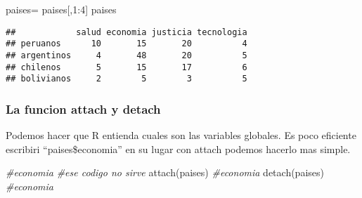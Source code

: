 \documentclass[
]{article}
\newenvironment{Shaded}{\begin{snugshade}}{\end{snugshade}}
\newcommand{\CommentTok}[1]{\textcolor[rgb]{0.56,0.35,0.01}{\textit{#1}}}
\newcommand{\DecValTok}[1]{\textcolor[rgb]{0.00,0.00,0.81}{#1}}
\newcommand{\FunctionTok}[1]{\textcolor[rgb]{0.00,0.00,0.00}{#1}}
\newcommand{\NormalTok}[1]{#1}
\newcommand{\OtherTok}[1]{\textcolor[rgb]{0.56,0.35,0.01}{#1}}
\newcommand{\SpecialCharTok}[1]{\textcolor[rgb]{0.00,0.00,0.00}{#1}}
\begin{document}
\begin{Shaded}
\begin{Highlighting}[]
\NormalTok{paises}\OtherTok{=}\NormalTok{ paises[,}\DecValTok{1}\SpecialCharTok{:}\DecValTok{4}\NormalTok{]}
\NormalTok{paises}
\end{Highlighting}
\end{Shaded}

\begin{verbatim}
##            salud economia justicia tecnologia
## peruanos      10       15       20          4
## argentinos     4       48       20          5
## chilenos       5       15       17          6
## bolivianos     2        5        3          5
\end{verbatim}

\hypertarget{la-funcion-attach-y-detach}{%
\subsubsection{La funcion attach y
detach}\label{la-funcion-attach-y-detach}}

Podemos hacer que R entienda cuales son las variables globales. Es poco
eficiente escribiri ``paises\$economia'' en su lugar con attach podemos
hacerlo mas simple.

\begin{Shaded}
\begin{Highlighting}[]
\CommentTok{\#economia}
\CommentTok{\#ese codigo no sirve}
\FunctionTok{attach}\NormalTok{(paises)}
\CommentTok{\#economia}
\FunctionTok{detach}\NormalTok{(paises)}
\CommentTok{\#economia}
\end{Highlighting}
\end{Shaded}
\end{document}
